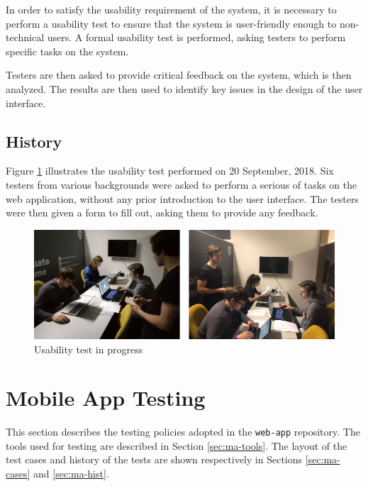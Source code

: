 \documentclass{article}
\begin{document}
    In order to satisfy the usability requirement of the system, it is
    necessary to perform a usability test to ensure that the system is
    user-friendly enough to non-technical users. A formal usability test is
    performed, asking testers to perform specific tasks on the system.
    
    Testers are then asked to provide critical feedback on the system, which is
    then analyzed. The results are then used to identify key issues in the
    design of the user interface.

    \subsection{History}
    \label{sec:wa-hist}

    Figure \ref{fig:usability} illustrates the usability test performed on 20
    September, 2018. Six testers from various backgrounds were asked to perform
    a serious of tasks on the web application, without any prior introduction
    to the user interface. The testers were then given a form to fill out,
    asking them to provide any feedback.

    \begin{figure}[h!]
        \centering
        \includegraphics[scale=0.55]{UsabilityTest}
        \caption{Usability test in progress}
        \label{fig:usability}
    \end{figure}

    \newpage
    

    \section{Mobile App Testing}
    \label{sec:mobile-app}

    This section describes the testing policies adopted in the \texttt{web-app}
    repository. The tools used for testing are described in Section
    \ref{sec:ma-tools}.  The layout of the test cases and history of the tests
    are shown respectively in Sections \ref{sec:ma-cases} and \ref{sec:ma-hist}.
\end{document}
